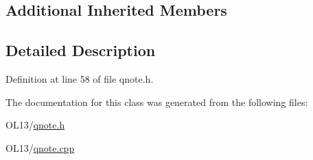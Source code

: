 \subsection*{Additional Inherited Members}


\subsection{Detailed Description}


Definition at line 58 of file qnote.\+h.



The documentation for this class was generated from the following files\+:\begin{DoxyCompactItemize}
\item 
O\+L13/\hyperlink{qnote_8h}{qnote.\+h}\item 
O\+L13/\hyperlink{qnote_8cpp}{qnote.\+cpp}\end{DoxyCompactItemize}
